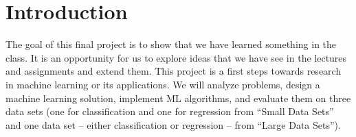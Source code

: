 \documentclass[conference]{IEEEtran}
\begin{document}
\section{Introduction}
The goal of this final project is to show that we have learned something in the class. It is an opportunity for us to explore ideas that we have see in the lectures and assignments and extend them. This project is a first steps towards research in machine learning or its applications. We will analyze problems, design a machine learning solution, implement ML algorithms, and evaluate them on three data sets (one for classification and one for regression from “Small Data Sets” and one data set – either classification or regression – from “Large Data Sets”).
\end{document}
